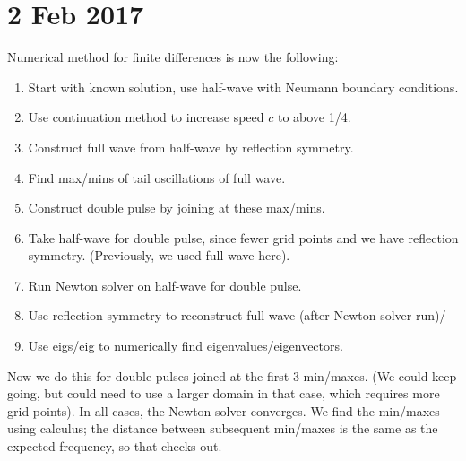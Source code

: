 \documentclass[12pt]{article}
\begin{document}
\section*{2 Feb 2017}
Numerical method for finite differences is now the following:
\begin{enumerate}
	\item Start with known solution, use half-wave with Neumann boundary conditions.
	\item Use continuation method to increase speed $c$ to above 1/4.
	\item Construct full wave from half-wave by reflection symmetry.
	\item Find max/mins of tail oscillations of full wave.
	\item Construct double pulse by joining at these max/mins.
	\item Take half-wave for double pulse, since fewer grid points and we have reflection symmetry. (Previously, we used full wave here).
	\item Run Newton solver on half-wave for double pulse.
	\item Use reflection symmetry to reconstruct full wave (after Newton solver run)/
	\item Use eigs/eig to numerically find eigenvalues/eigenvectors.
\end{enumerate}

Now we do this for double pulses joined at the first 3 min/maxes. (We could keep going, but could need to use a larger domain in that case, which requires more grid points). In all cases, the Newton solver converges. We find the min/maxes using calculus; the distance between subsequent min/maxes is the same as the expected frequency, so that checks out. 
\end{document}
